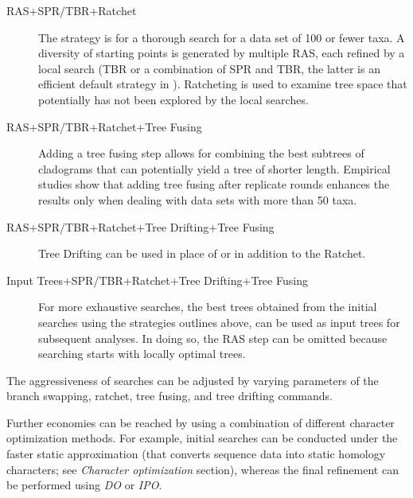 \begin{description} 

\item[RAS+SPR/TBR+Ratchet] The strategy is for
a thorough search for a data set of 100 or fewer taxa. A diversity
of starting points is generated by multiple RAS, each refined by a
local search (TBR or a combination of SPR and TBR, the latter is
an efficient default strategy in \poy). Ratcheting is used to examine
tree space that potentially has not been explored by the local
searches.  

\item[RAS+SPR/TBR+Ratchet+Tree Fusing]  Adding a tree
fusing step allows for combining the best subtrees of cladograms
that can potentially yield a tree of shorter length. Empirical
studies show that adding tree fusing after replicate rounds enhances
the results only when dealing with data sets with more than 50 taxa.

\item[RAS+SPR/TBR+Ratchet+Tree Drifting+Tree Fusing] Tree Drifting
can be used in place of or in addition to the Ratchet.  

\item[Input Trees+SPR/TBR+Ratchet+Tree Drifting+Tree Fusing] 
For more exhaustive searches, the best trees obtained from the initial 
searches using the strategies outlines above, can be used as input trees for
subsequent analyses. In doing so, the RAS step can be omitted because
searching starts with locally optimal trees.  

\end{description}

The aggressiveness of searches can be adjusted by varying parameters
of the branch swapping, ratchet, tree fusing, and tree drifting
commands.

Further economies can be reached by using a combination of different
character optimization methods. For example, initial searches can
be conducted under the faster static approximation (that converts
sequence data into static homology characters; see \emph{Character
optimization} section), whereas the final refinement can be performed
using \emph{DO} or \emph{IPO}.

